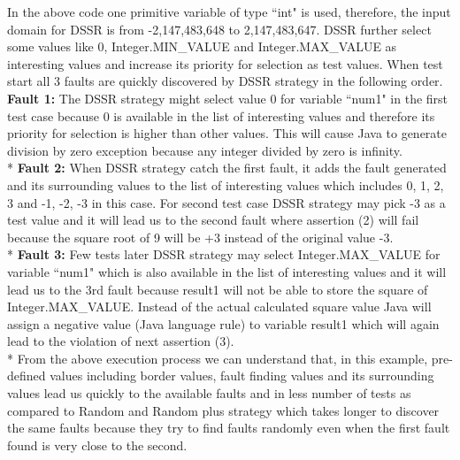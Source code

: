 \documentclass[conference]{IEEEtran}
\begin{document}
\endgroup
In the above code one primitive variable of type ``int" is used, therefore, the input domain for DSSR is from -2,147,483,648 to 2,147,483,647. DSSR further select some values like 0, Integer.MIN\_VALUE and Integer.MAX\_VALUE as interesting values and increase its priority for selection as test values. 
When test start all 3 faults are quickly discovered by DSSR strategy in the following order.\\
\indent \textbf{Fault 1:} The DSSR strategy might select value 0 for variable ``num1"  in the first test case because 0 is available in the list of interesting values and therefore its priority for selection is higher than other values. This will cause Java to generate division by zero exception because any integer divided by zero is infinity.\\*
\indent \textbf{Fault 2:} When DSSR strategy catch the first fault, it adds the fault generated and its surrounding values to the list of interesting values which includes 0, 1, 2, 3 and -1, -2, -3 in this case. For second test case DSSR strategy may pick -3 as a test value and it will lead us to the second fault where assertion (2) will fail because the square root of 9 will be +3 instead of the original value -3.\\*
\indent \textbf{Fault 3:} Few tests later DSSR strategy may select Integer.MAX\_VALUE for variable ``num1" which is also available in the list of interesting values and it will lead us to the 3rd fault because result1 will not be able to store the square of Integer.MAX\_VALUE. Instead of the actual calculated square value Java will assign a negative value (Java language rule) to variable result1 which will again lead to the violation of next assertion (3).\\*
\indent From the above execution process we can understand that, in this example, pre-defined values including border values, fault finding values and its surrounding values lead us quickly to the available faults and in less number of tests as compared to Random and Random plus strategy which takes longer to discover the same faults because they try to find faults randomly even when the first fault found is very close to the second.


\end{document}
